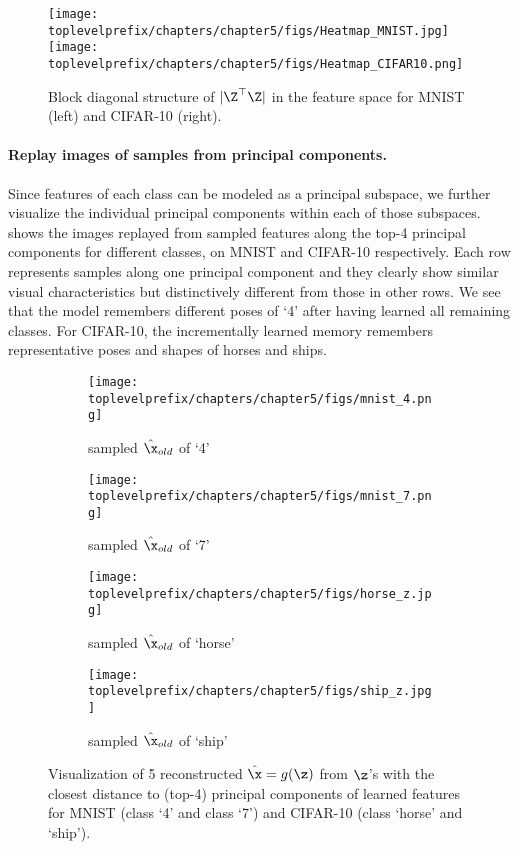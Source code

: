 \documentclass[../../book-main.tex]{subfiles}
\begin{document}
\begin{figure}[tb]
\centering
\texttt{[image: \\toplevelprefix/chapters/chapter5/figs/Heatmap\_MNIST.jpg]}  
\texttt{[image: \\toplevelprefix/chapters/chapter5/figs/Heatmap\_CIFAR10.png]}
\caption{\small Block diagonal structure of $|\Z^\top \Z|$ in the feature space for MNIST (left) and CIFAR-10 (right).}
\label{fig:cifar_10_pca_sampling_main}
\end{figure}



\paragraph{Replay images of samples from principal components.}
Since features of each class can be modeled as a principal subspace, we further visualize the individual principal components within each of those subspaces.  shows the images replayed from sampled features along the top-4 principal components for different classes, on MNIST and CIFAR-10 respectively. Each row represents samples along one principal component and they clearly show similar visual characteristics but distinctively different from those in other rows. We see that the model remembers different poses of `4' after having learned all remaining classes. For CIFAR-10, the incrementally learned memory remembers representative poses and shapes of horses and ships. 

\begin{figure}[t]
    \begin{subfigure}[t]{0.20\textwidth}
        \centering
        \texttt{[image: \\toplevelprefix/chapters/chapter5/figs/mnist\_4.png]}
        \caption{sampled $\hat{\x}_{old}$ of `4'}
    \end{subfigure}
    \hfill
    \begin{subfigure}[t]{0.20\textwidth}
        \centering
        \texttt{[image: \\toplevelprefix/chapters/chapter5/figs/mnist\_7.png]}
        \caption{sampled $\hat{\x}_{old}$ of `7'}
    \end{subfigure}
    \hfill
    \begin{subfigure}[t]{0.20\textwidth}
        \centering
        \texttt{[image: \\toplevelprefix/chapters/chapter5/figs/horse\_z.jpg]}
        \caption{sampled $\hat{\x}_{old}$ of `horse'}
    \end{subfigure}
    \hfill
    \begin{subfigure}[t]{0.20\textwidth}
        \centering
        \texttt{[image: \\toplevelprefix/chapters/chapter5/figs/ship\_z.jpg]}
        \caption{sampled $\hat{\x}_{old}$ of `ship'}
    \end{subfigure}
    \caption{\small Visualization of 5 reconstructed $\hat \x=g(\z)$ from $\z$'s with the closest distance to (top-4) principal components of learned features for {MNIST} (class ‘4’ and class ‘7’) and {CIFAR-10} (class ‘horse’ and  ‘ship’).}
    \label{fig:pca_sampling_main}
\end{figure}
\end{document}
